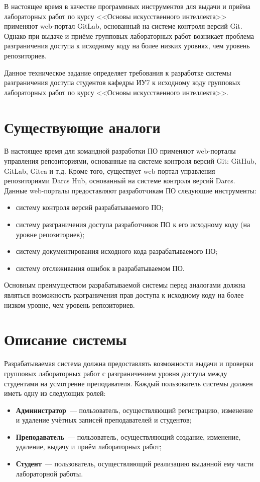 \documentclass{bmstu}
\begin{document}
  В настоящее время в качестве программных инструментов для выдачи и
  приёма лабораторных работ по курсу <<Основы искусственного
  интеллекта>> применяют web-портал GitLab, основанный на системе
  контроля версий Git.
  Однако при выдаче и приёме групповых лабораторных работ возникает
  проблема разграничения доступа к исходному коду на более низких
  уровнях, чем уровень репозиториев.

  Данное техническое задание определяет требования к разработке
  системы разграничения доступа студентов кафедры ИУ7 к исходному коду
  групповых лабораторных работ по курсу <<Основы искусственного
  интеллекта>>.

  \section{Существующие аналоги}

  В настоящее время для командной разработки ПО применяют web-порталы
  управления репозиториями, основанные на системе контроля версий Git:
  GitHub, GitLab, Gitea и т.д.
  Кроме того, существует web-портал управления репозиториями Darcs
  Hub, основанный на системе контроля версий Darcs.
  Данные web-порталы предоставляют разработчикам ПО следующие
  инструменты:
  \begin{itemize}[label=---]
    \item систему контроля версий разрабатываемого ПО;
    \item систему разграничения доступа разработчиков ПО к его
      исходному коду (на уровне репозиториев);
    \item систему документирования исходного кода разрабатываемого ПО;
    \item систему отслеживания ошибок в разрабатываемом ПО.
  \end{itemize}

  Основным преимуществом разрабатываемой системы перед аналогами
  должна являться возможность разграничения прав доступа к исходному
  коду на более низком уровне, чем уровень репозиториев.

  \section{Описание системы}

  Разрабатываемая система должна предоставлять возможности выдачи и
  проверки групповых лабораторных работ с разграничением уровня
  доступа между студентами на усмотрение преподавателя.
  Каждый пользователь системы должен иметь одну из следующих ролей:
  \begin{itemize}[label=---]
    \item \textbf{Администратор}~--- пользователь, осуществляющий
      регистрацию, изменение и удаление учётных записей преподавателей
      и студентов;
    \item \textbf{Преподаватель}~--- пользователь, осуществляющий
      создание, изменение, удаление, выдачу и приём лабораторных
      работ;
    \item \textbf{Студент}~--- пользователь, осуществляющий реализацию
      выданной ему части лабораторной работы.
  \end{itemize}
\end{document}
